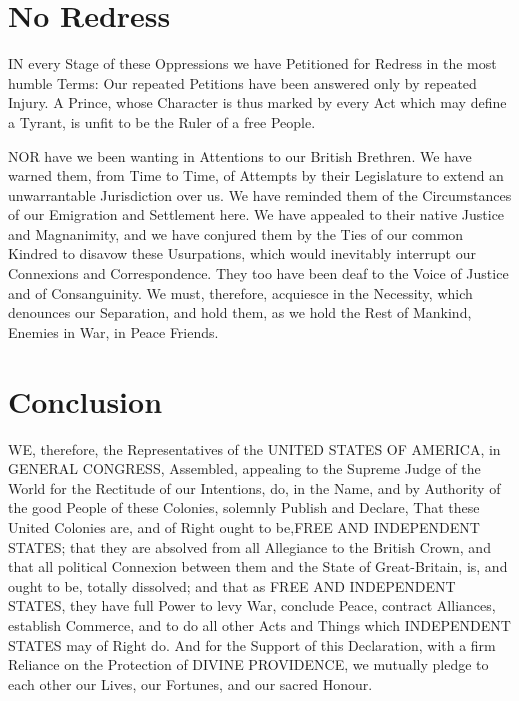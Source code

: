 \section{No Redress}

IN every Stage of these Oppressions we have Petitioned for Redress in the most humble Terms: Our repeated Petitions have been answered only by repeated Injury. A Prince, whose Character is thus marked by every Act which may define a Tyrant, is unfit to be the Ruler of a free People.

NOR have we been wanting in Attentions to our British Brethren. We have warned them, from Time to Time, of Attempts by their Legislature to extend an unwarrantable Jurisdiction over us. We have reminded them of the Circumstances of our Emigration and Settlement here. We have appealed to their native Justice and Magnanimity, and we have conjured them by the Ties of our common Kindred to disavow these Usurpations, which would inevitably interrupt our Connexions and Correspondence. They too have been deaf to the Voice of Justice and of Consanguinity. We must, therefore, acquiesce in the Necessity, which denounces our Separation, and hold them, as we hold the Rest of Mankind, Enemies in War, in Peace Friends.


\section{Conclusion}
WE, therefore, the Representatives of the UNITED STATES OF AMERICA, in GENERAL CONGRESS, Assembled, appealing to the Supreme Judge of the World for the Rectitude of our Intentions, do, in the Name, and by Authority of the good People of these Colonies, solemnly Publish and Declare, That these United Colonies are, and of Right ought to be,FREE AND INDEPENDENT STATES; that they are absolved from all Allegiance to the British Crown, and that all political Connexion between them and the State of Great-Britain, is, and ought to be, totally dissolved; and that as FREE AND INDEPENDENT STATES, they have full Power to levy War, conclude Peace, contract Alliances, establish Commerce, and to do all other Acts and Things which INDEPENDENT STATES may of Right do. And for the Support of this Declaration, with a firm Reliance on the Protection of DIVINE PROVIDENCE, we mutually pledge to each other our Lives, our Fortunes, and our sacred Honour.




